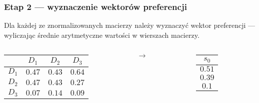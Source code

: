 \documentclass{beamer}
\begin{document}
\begin{frame}
\frametitle{Etap 2 --- wyznaczenie wektorów preferencji}
Dla każdej ze znormalizowanych macierzy należy wyznaczyć wektor preferencji --- wyliczając średnie arytmetyczne wartości w wierszach macierzy.
	\begin{columns}
		\begin{column}{0.4\textwidth}
			\begin{table}
				\begin{tabular}{c|c|c|c}
					&	$D_1$	&	$D_2$	&	$D_3$\\ \hline
				$D_1$	&	$0.47$	&	$0.43$	&	$0.64$\\ \hline
				$D_2$	&	$0.47$	&	$0.43$	&	$0.27$\\ \hline
				$D_3$	&	$0.07$	&	$0.14$	&	$0.09$
				\end{tabular}
			\end{table}
		\end{column}
		\begin{column}{0.1\textwidth}
			$\rightarrow$
		\end{column}
		\begin{column}{0.1\textwidth}
			\begin{table}
				\begin{tabular}{c}
				$s_0$\\ \hline
				$0.51$\\
				$0.39$\\
				$0.1$
				\end{tabular}
			\end{table}
		\end{column}
	\end{columns}
\end{frame}
\end{document}
